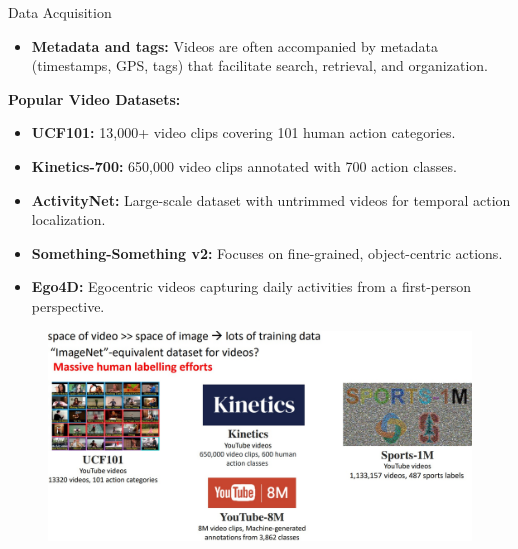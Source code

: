 \begin{frame}[allowframebreaks]{Data Acquisition}
\begin{itemize}
\begin{itemize}
        \end{itemize}
        \item \textbf{Metadata and tags:} Videos are often accompanied by metadata (timestamps, GPS, tags) that facilitate search, retrieval, and organization.
    \end{itemize}
\framebreak
    \item \textbf{Popular Video Datasets:}
    \begin{itemize}
        \item \textbf{UCF101:} 13,000+ video clips covering 101 human action categories.
        \item \textbf{Kinetics-700:} 650,000 video clips annotated with 700 action classes.
        \item \textbf{ActivityNet:} Large-scale dataset with untrimmed videos for temporal action localization.
        \item \textbf{Something-Something v2:} Focuses on fine-grained, object-centric actions.
        \item \textbf{Ego4D:} Egocentric videos capturing daily activities from a first-person perspective.
    \end{itemize}
\framebreak
    \begin{figure}
        \centering
        \includegraphics[width=1\textwidth,height=0.9\textheight,keepaspectratio]{images/video/slide_18_1_img.jpg}
    \end{figure}
\framebreak
    \begin{figure}
        \centering

\end{figure}
\end{frame}
